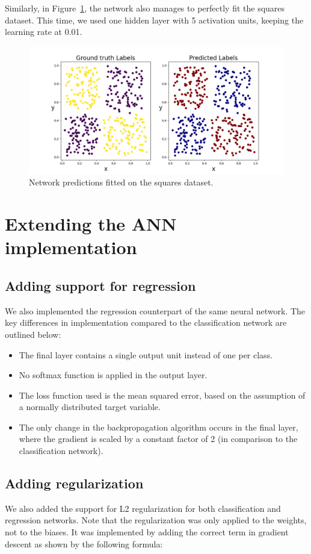 \documentclass[9pt]{IEEEtran}
\begin{document}
Similarly, in Figure~\ref{fig:squares}, the network also manages to perfectly fit the squares dataset. 
This time, we used one hidden layer with 5 activation units, keeping the learning rate at 0.01.

\begin{figure}[h]
    \centering
    \includegraphics[width=1\columnwidth]{figures/squares.png}
    \caption{Network predictions fitted on the squares dataset.}
    \label{fig:squares}
\end{figure}

\section{Extending the ANN implementation}
\subsection{Adding support for regression}
We also implemented the regression counterpart of the same neural network.
 The key differences in implementation compared to the classification network are outlined below:

\begin{itemize}
    \item The final layer contains a single output unit instead of one per class.
    \item No softmax function is applied in the output layer.
    \item The loss function used is the mean squared error, based on the assumption of a normally distributed target variable.
    \item The only change in the backpropagation algorithm occurs in the final layer, where the gradient is scaled by a constant factor of 2 (in comparison to the classification network).
\end{itemize}

\subsection{Adding regularization}
We also added the support for L2 regularization for both classification and regression networks. 
Note that the regularization was only applied to the weights, not to the biases.
It was implemented by adding the correct term in gradient descent
  as shown by the following formula:
\end{document}
